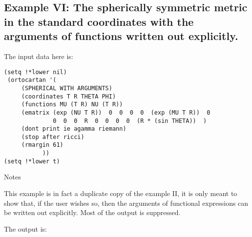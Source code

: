 \subsection{Example VI: The spherically symmetric metric in the standard
coordinates with the arguments of functions written out explicitly.}

The input data here is:

\bigskip

\begin{verbatim}
(setq !*lower nil)
 (ortocartan '(
     (SPHERICAL WITH ARGUMENTS)
     (coordinates T R THETA PHI)
     (functions MU (T R) NU (T R))
     (ematrix (exp (NU T R))  0  0  0  0  (exp (MU T R))  0
              0  0  0  R  0  0  0  0  (R * (sin THETA))  )
     (dont print ie agamma riemann)
     (stop after ricci)
     (rmargin 61)
           ))
(setq !*lower t)
\end{verbatim}

\bigskip

\centerline{Notes}

This example is in fact a duplicate copy of the example
     II, it is only meant to show that, if the  user  wishes  so,
     then the arguments of functional expressions can be  written
     out explicitly. Most of the output is suppressed.

The output is:

\bigskip

